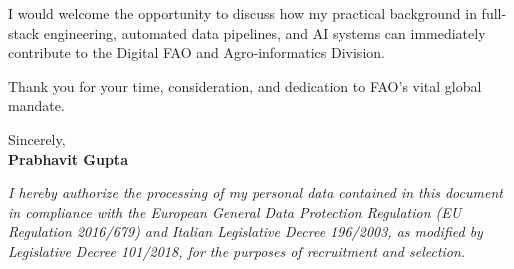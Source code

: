 \documentclass[11pt,a4paper]{article}
\begin{document}
I would welcome the opportunity to discuss how my practical background in full-stack engineering, automated data pipelines, and AI systems can immediately contribute to the Digital FAO and Agro-informatics Division.

Thank you for your time, consideration, and dedication to FAO's vital global mandate.

Sincerely,\\
\textbf{Prabhavit Gupta}

\vfill
\noindent\textit{\footnotesize I hereby authorize the processing of my personal data contained in this document in compliance with the European General Data Protection Regulation (EU Regulation 2016/679) and Italian Legislative Decree 196/2003, as modified by Legislative Decree 101/2018, for the purposes of recruitment and selection.}
\end{document}
